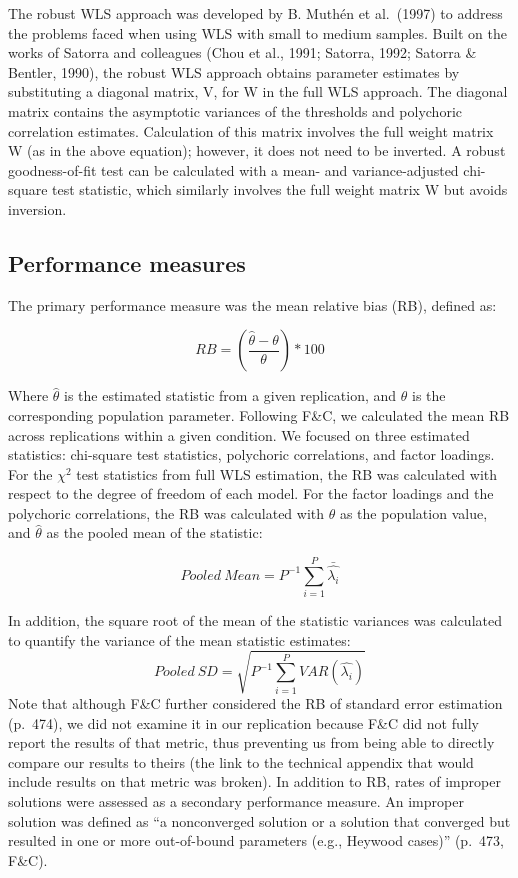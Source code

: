\documentclass[10,a4paperpaper,]{article}
\begin{document}
The robust WLS approach was developed by B. Muthén et al.~(1997) to
address the problems faced when using WLS with small to medium samples.
Built on the works of Satorra and colleagues (Chou et al., 1991;
Satorra, 1992; Satorra \& Bentler, 1990), the robust WLS approach
obtains parameter estimates by substituting a diagonal matrix, V, for W
in the full WLS approach. The diagonal matrix contains the asymptotic
variances of the thresholds and polychoric correlation estimates.
Calculation of this matrix involves the full weight matrix W (as in the
above equation); however, it does not need to be inverted. A robust
goodness-of-fit test can be calculated with a mean- and
variance-adjusted chi-square test statistic, which similarly involves
the full weight matrix W but avoids inversion.

\subsection{Performance measures}

The primary performance measure was the mean relative bias (RB), defined
as:

\[RB = (\frac{\hat{\theta} - \theta}{\theta})*100 \]

Where \(\hat{\theta}\) is the estimated statistic from a given
replication, and \(\theta\) is the corresponding population parameter.
Following F\&C, we calculated the mean RB across replications within a
given condition. We focused on three estimated statistics: chi-square
test statistics, polychoric correlations, and factor loadings. For the
\(\chi^{2}\) test statistics from full WLS estimation, the RB was
calculated with respect to the degree of freedom of each model. For the
factor loadings and the polychoric correlations, the RB was calculated
with \(\theta\) as the population value, and \(\hat{\theta}\) as the
pooled mean of the statistic:

\[ Pooled\ Mean = P^{-1} \displaystyle \sum_{i=1}^P \bar{\hat{\lambda_i}} \]

In addition, the square root of the mean of the statistic variances was
calculated to quantify the variance of the mean statistic estimates:
\[Pooled\ SD = \sqrt{P^{-1}\sum_{i=1}^P VAR(\hat{\lambda_i})}\] Note
that although F\&C further considered the RB of standard error
estimation (p.~474), we did not examine it in our replication because
F\&C did not fully report the results of that metric, thus preventing us
from being able to directly compare our results to theirs (the link to
the technical appendix that would include results on that metric was
broken). In addition to RB, rates of improper solutions were assessed as
a secondary performance measure. An improper solution was defined as ``a
nonconverged solution or a solution that converged but resulted in one
or more out-of-bound parameters (e.g., Heywood cases)'' (p.~473, F\&C).
\end{document}
